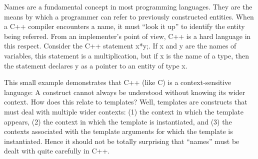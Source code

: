 Names are a fundamental concept in most programming languages. They are the means by which a programmer can refer to previously constructed entities. When a C++ compiler encounters a name, it must “look it up” to identify the entity being referred. From an implementer’s point of view, C++ is a hard language in this respect. Consider the C++ statement x*y;. If x and y are the names of variables, this statement is a multiplication, but if x is the name of a type, then the statement declares y as a pointer to an entity of type x.

This small example demonstrates that C++ (like C) is a context-sensitive language: A construct cannot always be understood without knowing its wider context. How does this relate to templates? Well, templates are constructs that must deal with multiple wider contexts: (1) the context in which the template appears, (2) the context in which the template is instantiated, and (3) the contexts associated with the template arguments for which the template is instantiated. Hence it should not be totally surprising that “names” must be dealt with quite carefully in C++.